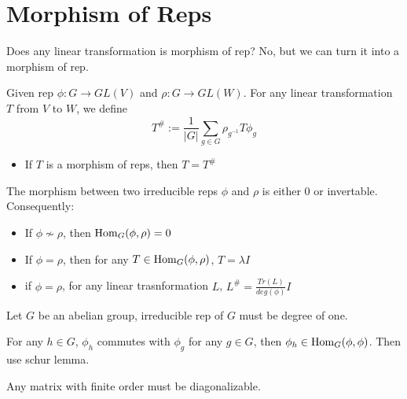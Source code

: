 \documentclass[15pt]{scrartcl}
\begin{document}
\section{Morphism of Reps}
Does any linear transformation is morphism of rep? No, but we can turn it into a morphism of rep. 
\begin{definition}
Given rep $\phi: G\to GL(V)$ and $\rho: G\to GL(W)$. For any linear transformation $T$ from $V$ to $W$, we define \[T^{\#}:=\frac{1}{|G|}\sum_{g\in G}\rho_{g^{-1}}T\phi_g\]
\end{definition}
\begin{proposition}
\begin{itemize}
\item If $T$ is a morphism of reps, then $T=T^\#$
\end{itemize}
\end{proposition}
\begin{lemma}
The morphism between two irreducible reps $\phi$ and $\rho$ is either 0 or invertable. Consequently: 

\begin{itemize}
\item If $\phi\not\sim\rho$, then $\operatorname{Hom}_G(\phi, \rho)=0$ 
\item If $\phi=\rho$, then for any $T\in \operatorname{Hom}_G(\phi, \rho)$, $T=\lambda I$ 
\item if $\phi=\rho$, for any linear trasnformation $L$, $L^\#=\frac{Tr(L)}{deg(\phi)}I$
\end{itemize}
\end{lemma}
\begin{corollary}
Let $G$ be an abelian group, irreducible rep of $G$ must be degree of one. 
\end{corollary}
For any $h\in G$, $\phi_h$ commutes with $\phi_g$ for any $g\in G$, then $\phi_h\in \operatorname{Hom}_G(\phi, \phi)$. Then use schur lemma. 
\begin{corollary}
Any matrix with finite order must be diagonalizable. 
\end{corollary}
\end{document}
